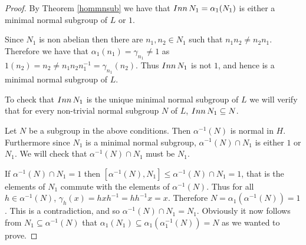 \begin{proof}
    By Theorem \ref{hommnsub} we have that $Inn\, {N}_1 = \alpha_1(N_1)$ is either a minimal normal subgroup of $L$ or $1$. 
    
    Since $N_1$ is non abelian then there are $n_1, n_2 \in N_1$ such that $n_1n_2 \neq n_2n_1$. Therefore we have that $\alpha_1(n_1) = \gamma_{n_1} \neq 1$ as $1(n_2) = n_2 \neq n_1n_2n_1^{-1} = \gamma_{n_1}(n_2)$. Thus $Inn\, {N}_1$ is not $1$, and hence is a minimal normal subgroup of $L$.

    To check that $Inn\, {N}_1$ is the unique minimal normal subgroup of $L$ we will verify that for every non-trivial normal subgroup $N$ of $L$, $Inn\, {N}_1 \subseteq N$. 
    
    Let $N$ be a subgroup in the above conditions. Then $\alpha^{-1}(N)$ is normal in $H$. Furthermore since $N_1$ is a minimal normal subgroup, $\alpha^{-1}(N) \cap N_1$ is either $1$ or $N_1$. We will check that $\alpha^{-1}(N) \cap N_1$ must be $N_1$.

    If $\alpha^{-1}(N) \cap N_1 = 1$ then $[\alpha^{-1}(N), N_1] \le \alpha^{-1}(N) \cap N_1 = 1$, that is the elements of $N_1$ commute with the elements of $\alpha^{-1}(N)$. Thus for all $h \in \alpha^{-1}(N)$, $\gamma_h(x) = hxh^{-1} = hh^{-1}x = x$. Therefore $N = \alpha_1(\alpha^{-1}(N)) = 1$. This is a contradiction, and so $\alpha^{-1}(N) \cap N_1 = N_1$.
    Obviously it now follows from $N_1 \subseteq \alpha^{-1}(N)$ that $\alpha_1(N_1) \subseteq \alpha_1(\alpha_1^{-1}(N)) = N$ as we wanted to prove.
\end{proof}

